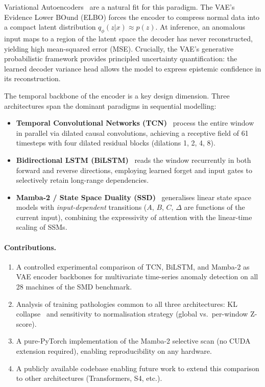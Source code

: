 \documentclass[10pt,twocolumn]{article}
\begin{document}
Variational Autoencoders~\cite{kingma2013auto} are a natural fit for this
paradigm. The VAE's Evidence Lower BOund (ELBO) forces the encoder to compress
normal data into a compact latent distribution $q_\phi(z|x) \approx p(z)$. At
inference, an anomalous input maps to a region of the latent space the decoder
has never reconstructed, yielding high mean-squared error (MSE). Crucially, the
VAE's generative probabilistic framework provides principled uncertainty
quantification: the learned decoder variance head allows the model to express
epistemic confidence in its reconstruction.

The temporal backbone of the encoder is a key design dimension.  Three
architectures span the dominant paradigms in sequential modelling:

\begin{itemize}
  \item \textbf{Temporal Convolutional Networks (TCN)}~\cite{bai2018empirical}
        process the entire window in parallel via dilated causal convolutions,
        achieving a receptive field of 61 timesteps with four dilated residual
        blocks (dilations 1, 2, 4, 8).

  \item \textbf{Bidirectional LSTM (BiLSTM)}~\cite{hochreiter1997long}
        reads the window recurrently in both forward and reverse directions,
        employing learned forget and input gates to selectively retain
        long-range dependencies.

  \item \textbf{Mamba-2 / State Space Duality (SSD)}~\cite{dao2024transformers}
        generalises linear state space models with \emph{input-dependent}
        transitions ($A$, $B$, $C$, $\Delta$ are functions of the current
        input), combining the expressivity of attention with the linear-time
        scaling of SSMs.
\end{itemize}

\paragraph{Contributions.}
\begin{enumerate}
  \item A controlled experimental comparison of TCN, BiLSTM, and Mamba-2 as VAE
        encoder backbones for multivariate time-series anomaly detection on all
        28 machines of the SMD benchmark.
  \item Analysis of training pathologies common to all three architectures:
        KL collapse~\cite{bowman2016generating} and sensitivity to normalisation
        strategy (global vs.\ per-window Z-score).
  \item A pure-PyTorch implementation of the Mamba-2 selective scan (no CUDA
        extension required), enabling reproducibility on any hardware.
  \item A publicly available codebase enabling future work to extend this
        comparison to other architectures (Transformers, S4, etc.).
\end{enumerate}
\end{document}
